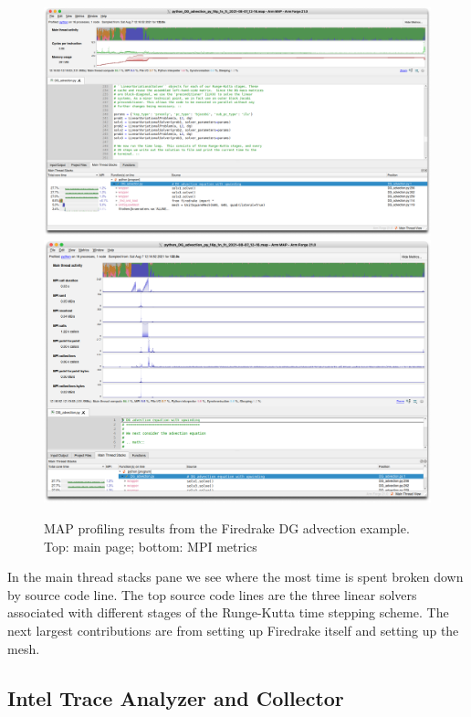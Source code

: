 \documentclass[a4paper,titlepage]{article}
\begin{document}
\begin{figure}[htbp]
\begin{center}
\includegraphics[scale=0.3]{figures/DG_advection_MAP_mainPage}
\includegraphics[scale=0.3]{figures/DG_advection_MAP_MPI}
\caption{MAP profiling results from the Firedrake DG advection example. Top: main page; bottom: MPI metrics}
\label{fig:DG_advection_MAP}
\end{center}
\end{figure}
%
In the main thread stacks pane we see where the most time is spent broken down by source code line. The top source code lines are the three linear solvers associated with different stages of the Runge-Kutta time stepping scheme. The next largest contributions are from setting up Firedrake itself and setting up the mesh.


\subsection{Intel Trace Analyzer and Collector}
\end{document}
